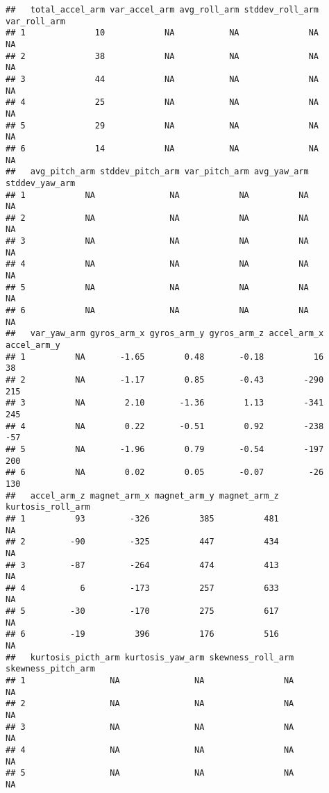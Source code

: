 \documentclass[]{article}
\begin{document}
\begin{verbatim}
##   total_accel_arm var_accel_arm avg_roll_arm stddev_roll_arm var_roll_arm
## 1              10            NA           NA              NA           NA
## 2              38            NA           NA              NA           NA
## 3              44            NA           NA              NA           NA
## 4              25            NA           NA              NA           NA
## 5              29            NA           NA              NA           NA
## 6              14            NA           NA              NA           NA
##   avg_pitch_arm stddev_pitch_arm var_pitch_arm avg_yaw_arm stddev_yaw_arm
## 1            NA               NA            NA          NA             NA
## 2            NA               NA            NA          NA             NA
## 3            NA               NA            NA          NA             NA
## 4            NA               NA            NA          NA             NA
## 5            NA               NA            NA          NA             NA
## 6            NA               NA            NA          NA             NA
##   var_yaw_arm gyros_arm_x gyros_arm_y gyros_arm_z accel_arm_x accel_arm_y
## 1          NA       -1.65        0.48       -0.18          16          38
## 2          NA       -1.17        0.85       -0.43        -290         215
## 3          NA        2.10       -1.36        1.13        -341         245
## 4          NA        0.22       -0.51        0.92        -238         -57
## 5          NA       -1.96        0.79       -0.54        -197         200
## 6          NA        0.02        0.05       -0.07         -26         130
##   accel_arm_z magnet_arm_x magnet_arm_y magnet_arm_z kurtosis_roll_arm
## 1          93         -326          385          481                NA
## 2         -90         -325          447          434                NA
## 3         -87         -264          474          413                NA
## 4           6         -173          257          633                NA
## 5         -30         -170          275          617                NA
## 6         -19          396          176          516                NA
##   kurtosis_picth_arm kurtosis_yaw_arm skewness_roll_arm skewness_pitch_arm
## 1                 NA               NA                NA                 NA
## 2                 NA               NA                NA                 NA
## 3                 NA               NA                NA                 NA
## 4                 NA               NA                NA                 NA
## 5                 NA               NA                NA                 NA

\end{verbatim}
\end{document}
